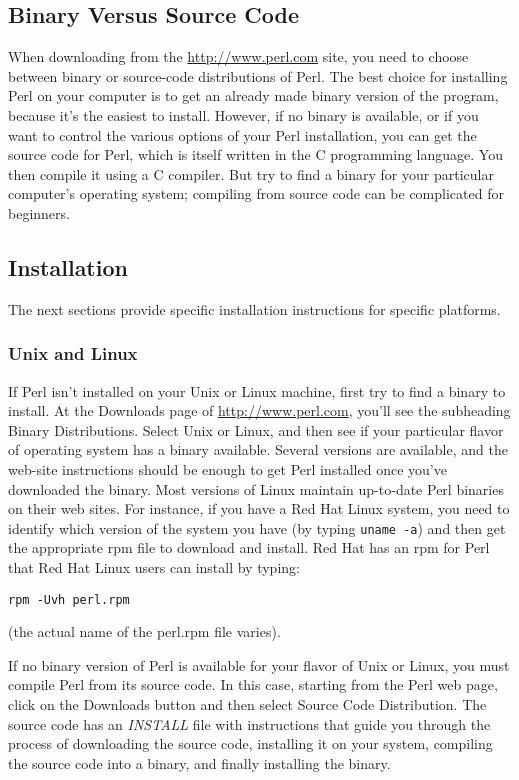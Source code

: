 \subsection{Binary Versus Source Code}
When downloading from the \href{http://www.perl.com}{http://www.perl.com} site, you need to choose between binary or source-code distributions of Perl. The best choice for installing Perl on your computer is to get an already made binary version of the program, because it's the easiest to install. However, if no binary is available, or if you want to control the various options of your Perl installation, you can get the source code for Perl, which is itself written in the C programming language. You then compile it using a C compiler. But try to find a binary for your particular computer's operating system; compiling from source code can be complicated for beginners. 

\subsection{Installation}
The next sections provide specific installation instructions for specific platforms.

\subsubsection{Unix and Linux}
If Perl isn't installed on your Unix or Linux machine, first try to find a binary to install. At the Downloads page of \href{http://www.perl.com}{http://www.perl.com}, you'll see the subheading Binary Distributions. Select Unix or Linux, and then see if your particular flavor of operating system has a binary available.  Several versions are available, and the web-site instructions should be enough to get Perl installed once you've downloaded the binary. Most versions of Linux maintain up-to-date Perl binaries on their web sites.  For instance, if you have a Red Hat Linux system, you need to identify which version of the system you have (by typing \verb|uname -a|) and then get the appropriate rpm file to download and install. Red Hat has an rpm for Perl that Red Hat Linux users can install by typing: 

\verb|rpm -Uvh perl.rpm|

(the actual name of the perl.rpm file varies).

If no binary version of Perl is available for your flavor of Unix or Linux, you must compile Perl from its source code. In this case, starting from the Perl web page, click on the Downloads button and then select Source Code Distribution. The source code has an \textit{INSTALL} file with instructions that guide you through the process of downloading the source code, installing it on your system, compiling the source code into a binary, and finally installing the binary.  


